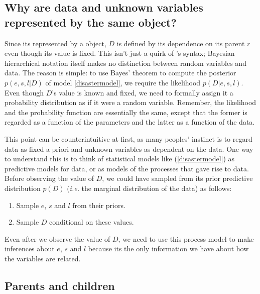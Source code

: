 \documentclass[]{jss}
\begin{document}
\subsection{Why are data and unknown variables represented by the same
object?}
Since its represented by a  object, $D$ is defined by its dependence on its parent $r$ even though its value is fixed. This isn't just a quirk of 's syntax; Bayesian hierarchical notation itself makes no distinction between random variables and data. The reason is simple: to use Bayes' theorem to compute the posterior $p(e,s,l|D)$ of model \ref{disastermodel}, we require the likelihood $p(D|e,s,l)$. Even though $D$'s value is known and fixed, we need to formally assign it a probability distribution as if it were a random variable. Remember, the likelihood and the probability function are essentially the same, except that the former is regarded as a function of the parameters and the latter as a function of the data.

This point can be counterintuitive at first, as many peoples' instinct is to regard data as fixed a priori and unknown variables as dependent on the data. One way to understand this is to think of statistical models like (\ref{disastermodel}) as predictive models for data, or as models of the processes that gave rise to data. Before observing the value of $D$, we could have sampled from its prior predictive distribution $p(D)$ (\emph{i.e.} the marginal distribution of the data) as follows:
\begin{enumerate}
    \item Sample $e$, $s$ and $l$ from their priors.
    \item Sample $D$ conditional on these values.
\end{enumerate}
Even after we observe the value of $D$, we need to use this process model to make inferences about $e$, $s$ and $l$ because its the only information we have about how the variables are related.

\subsection{Parents and children}
\end{document}
